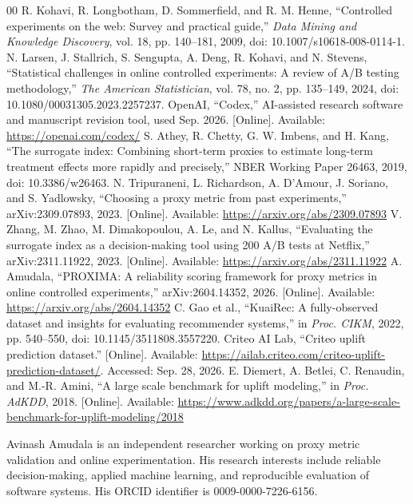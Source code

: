 \documentclass{ieeeaccess}
\begin{document}
\begin{thebibliography}{00}
 R. Kohavi, R. Longbotham, D. Sommerfield, and R. M. Henne, ``Controlled experiments on the web: Survey and practical guide,'' \emph{Data Mining and Knowledge Discovery}, vol. 18, pp. 140--181, 2009, doi: 10.1007/s10618-008-0114-1.
 N. Larsen, J. Stallrich, S. Sengupta, A. Deng, R. Kohavi, and N. Stevens, ``Statistical challenges in online controlled experiments: A review of A/B testing methodology,'' \emph{The American Statistician}, vol. 78, no. 2, pp. 135--149, 2024, doi: 10.1080/00031305.2023.2257237.
 OpenAI, ``Codex,'' AI-assisted research software and manuscript revision tool, used Sep. 2026. [Online]. Available: \url{https://openai.com/codex/}
 S. Athey, R. Chetty, G. W. Imbens, and H. Kang, ``The surrogate index: Combining short-term proxies to estimate long-term treatment effects more rapidly and precisely,'' NBER Working Paper 26463, 2019, doi: 10.3386/w26463.
 N. Tripuraneni, L. Richardson, A. D'Amour, J. Soriano, and S. Yadlowsky, ``Choosing a proxy metric from past experiments,'' arXiv:2309.07893, 2023. [Online]. Available: \url{https://arxiv.org/abs/2309.07893}
 V. Zhang, M. Zhao, M. Dimakopoulou, A. Le, and N. Kallus, ``Evaluating the surrogate index as a decision-making tool using 200 A/B tests at Netflix,'' arXiv:2311.11922, 2023. [Online]. Available: \url{https://arxiv.org/abs/2311.11922}
 A. Amudala, ``PROXIMA: A reliability scoring framework for proxy metrics in online controlled experiments,'' arXiv:2604.14352, 2026. [Online]. Available: \url{https://arxiv.org/abs/2604.14352}
 C. Gao et al., ``KuaiRec: A fully-observed dataset and insights for evaluating recommender systems,'' in \emph{Proc. CIKM}, 2022, pp. 540--550, doi: 10.1145/3511808.3557220.
 Criteo AI Lab, ``Criteo uplift prediction dataset.'' [Online]. Available: \url{https://ailab.criteo.com/criteo-uplift-prediction-dataset/}. Accessed: Sep. 28, 2026.
 E. Diemert, A. Betlei, C. Renaudin, and M.-R. Amini, ``A large scale benchmark for uplift modeling,'' in \emph{Proc. AdKDD}, 2018. [Online]. Available: \url{https://www.adkdd.org/papers/a-large-scale-benchmark-for-uplift-modeling/2018}
\end{thebibliography}

\begin{IEEEbiographynophoto}{Avinash Amudala}
is an independent researcher working on proxy metric validation and online experimentation. His research interests include reliable decision-making, applied machine learning, and reproducible evaluation of software systems. His ORCID identifier is 0009-0000-7226-6156.
\end{IEEEbiographynophoto}
\EOD
\end{document}
